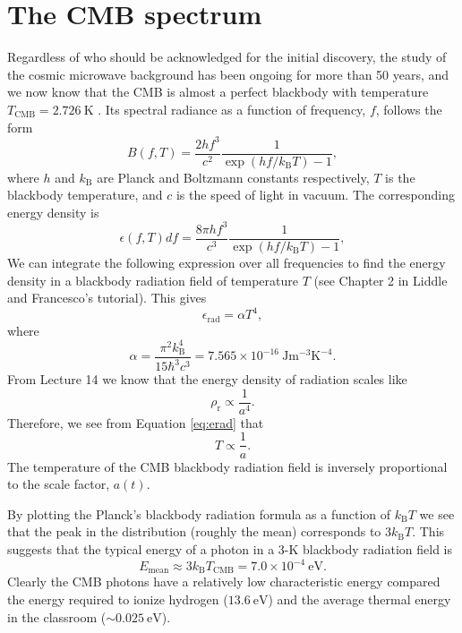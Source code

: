 \documentclass[a4paper,12pt]{article}
\theoremstyle{remark}
\newcommand{\mrm}[1]{\mathrm{#1}}
\renewcommand{\=}[1]{\stackrel{#1}{=}} %
\theoremstyle{plain}
\theoremstyle{definition}
\begin{document}
\section{The CMB spectrum}
Regardless of who should be acknowledged for the initial discovery, the study of the cosmic microwave background has been ongoing for more than 50 years, and we now know that the CMB is almost a perfect blackbody with temperature $T_{\mrm{CMB}} = 2.726\:\mrm{K}$ \cite{Fixsen2009}. Its spectral radiance as a function of frequency, $f$, follows the form
\begin{equation}
B(f, T) = \frac{2hf^{3}}{c^{2}}\frac{1}{\exp(hf /k_{\mrm{B}}T) -1},
\end{equation}
where $h$ and $k_{\mrm{B}}$ are Planck and Boltzmann constants respectively, $T$ is the blackbody temperature, and $c$ is the speed of light in vacuum. The corresponding energy density is
\begin{equation}
\epsilon (f, T) df = \frac{8\pi hf^{3}}{c^{3}}\frac{1}{\exp(hf /k_{\mrm{B}}T) -1},
\end{equation}
We can integrate the following expression over all frequencies to find the energy density in a blackbody radiation field of temperature $T$ (see Chapter 2 in Liddle and Francesco's tutorial). This gives
\begin{equation}
\epsilon _\mrm{rad} = \alpha T^{4},
\label{eq:erad}
\end{equation}
where 
\begin{equation}
\alpha = \frac{\pi ^{2} k_\mrm{B}^{4}}{15 \hbar ^{3} c^{3}} = 7.565 \times 10 ^{-16} \:\mrm{J m^{-3} K^{-4}}.
\end{equation}
From Lecture 14 we know that the energy density of radiation scales like
\begin{equation}
\rho _\mrm{r} \propto \frac{1}{a^{4}}.
\end{equation}
Therefore, we see from Equation \ref{eq:erad} that 
\begin{equation}
T \propto \frac{1}{a}.
\label{eq:Tvsa}
\end{equation}
The temperature of the CMB blackbody radiation field is inversely proportional to the scale factor, $a(t)$. 

By plotting the Planck's blackbody radiation formula as a function of $k_\mrm{B}T$ we see that the peak in the distribution (roughly the mean) corresponds to $3k_\mrm{B}T$. This suggests that the typical energy of a photon in a 3-K blackbody radiation field is 
\begin{equation}
E _\mrm{mean} \approx 3 k_\mrm{B}T_\mrm{CMB} = 7.0 \times 10^{-4} \:\mrm{eV}.
\end{equation}
Clearly the CMB photons have a relatively low characteristic energy compared the energy required to ionize hydrogen ($13.6 \: \mrm{eV}$) and the average thermal energy in the classroom ($\sim 0.025 \: \mrm{eV}$).
\end{document}
